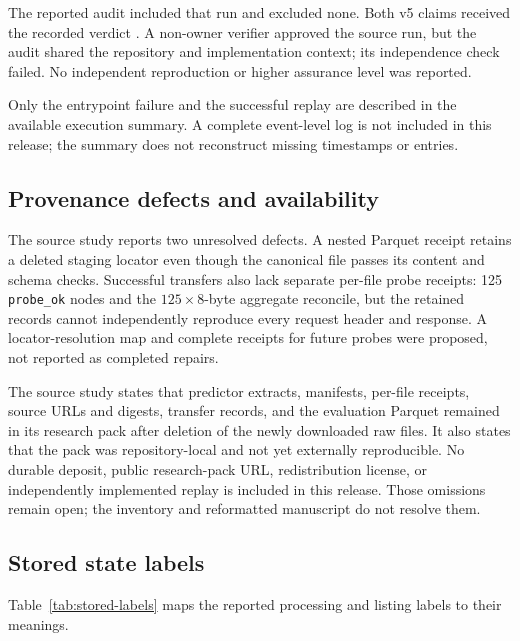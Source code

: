 The reported audit included that run and excluded none. Both v5 claims received the recorded verdict . A non-owner verifier approved the source run, but the audit shared the repository and implementation context; its independence check failed. No independent reproduction or higher assurance level was reported.

Only the entrypoint failure and the successful replay are described in the available execution summary. A complete event-level log is not included in this release; the summary does not reconstruct missing timestamps or entries.

\subsection{Provenance defects and availability}
The source study reports two unresolved defects. A nested Parquet receipt retains a deleted staging locator even though the canonical file passes its content and schema checks. Successful transfers also lack separate per-file probe receipts: 125 \texttt{probe\_ok} nodes and the $125\times8$-byte aggregate reconcile, but the retained records cannot independently reproduce every request header and response. A locator-resolution map and complete receipts for future probes were proposed, not reported as completed repairs.

The source study states that predictor extracts, manifests, per-file receipts, source URLs and digests, transfer records, and the evaluation Parquet remained in its research pack after deletion of the newly downloaded raw files. It also states that the pack was repository-local and not yet externally reproducible. No durable deposit, public research-pack URL, redistribution license, or independently implemented replay is included in this release. Those omissions remain open; the inventory and reformatted manuscript do not resolve them.


\subsection{Stored state labels}
Table~\ref{tab:stored-labels} maps the reported processing and listing labels to their meanings.

